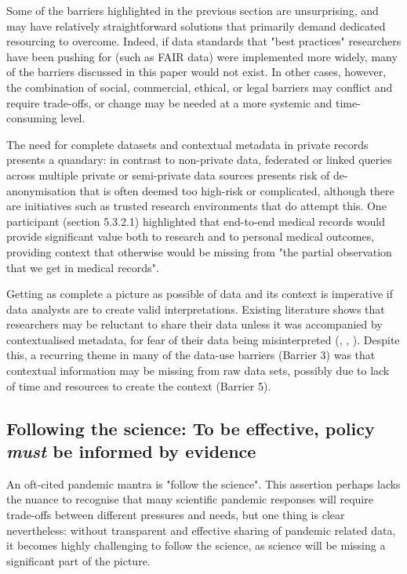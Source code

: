 \documentclass{CUP-JNL-DAP}%
\begin{document}
Some of the barriers highlighted in the previous section are unsurprising, and may have relatively straightforward solutions that primarily demand dedicated resourcing to overcome. Indeed, if data standards that "best practices" researchers have been pushing for (such as FAIR data) were implemented more widely, many of the barriers discussed in this paper would not exist. In other cases, however, the combination of social, commercial, ethical, or legal barriers may conflict and require trade-offs, or change may be needed at a more systemic and time-consuming level. 

The need for complete datasets and contextual metadata in private records presents a quandary: in contrast to non-private data, federated or linked queries across multiple private or semi-private data sources presents risk of de-anonymisation that is often deemed too high-risk or complicated, although there are initiatives such as trusted research environments that do attempt this. One participant (section 5.3.2.1) highlighted that end-to-end medical records would provide significant value both to research and to personal medical outcomes, providing context that otherwise would be missing from "the partial observation that we get in medical records".

Getting as complete a picture as possible of data and its context is imperative if data analysts are to create valid interpretations. Existing literature shows that researchers may be reluctant to share their data unless it was accompanied by contextualised metadata, for fear of their data being misinterpreted  (\cite{datasharing_rcts}, \cite{Yimei_Zhu_Open_access_in_uk}, \cite{empirical_datasharing_plos}). Despite this, a recurring theme in many of the data-use barriers (Barrier 3) was that contextual information may be missing from raw data sets, possibly due to lack of time and resources to create the context (Barrier 5). 

\subsection{Following the science: To be effective, policy \textit{must} be informed by evidence}

An oft-cited pandemic mantra is "follow the science". This assertion perhaps lacks the nuance to recognise that many scientific pandemic responses will require trade-offs between different pressures and needs, but one thing is clear nevertheless: without transparent and effective sharing of pandemic related data, it becomes highly challenging to follow the science, as science will be missing a significant part of the picture. 
\end{document}
